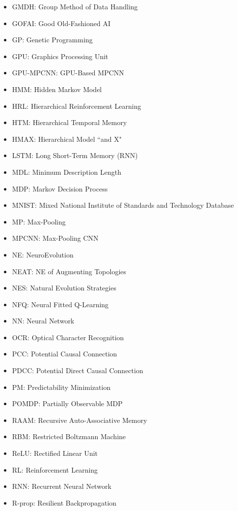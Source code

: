 \documentclass[letterpaper]{article}
\begin{document}
\begin{CJK*}{UTF8}{gbsn}
\begin{multicols}{2}
\begin{itemize}[leftmargin=0cm,itemindent=0cm,labelwidth=\itemindent,labelsep=0cm,align=left,noitemsep,nolistsep]
\item[] GMDH: Group Method of Data Handling  
\item[] GOFAI: Good Old-Fashioned AI  
\item[] GP: Genetic Programming 
\item[] GPU: Graphics Processing Unit 
\item[] GPU-MPCNN: GPU-Based MPCNN  
\item[] HMM: Hidden Markov Model 
\item[] HRL: Hierarchical Reinforcement Learning 
\item[] HTM:  Hierarchical Temporal Memory 
\item[] HMAX:  Hierarchical Model ``and X"
\item[] LSTM: Long Short-Term Memory (RNN) 
\item[] MDL: Minimum Description Length 
\item[] MDP:  Markov Decision Process 
\item[] MNIST: Mixed National Institute of Standards and Technology Database 
\item[] MP: Max-Pooling 
\item[] MPCNN: Max-Pooling CNN
\item[] NE: NeuroEvolution 
\item[] NEAT: NE of Augmenting Topologies 
\item[] NES: Natural Evolution Strategies 
\item[] NFQ: Neural Fitted Q-Learning 
\item[] NN: Neural Network 
\item[] OCR: Optical Character Recognition
\item[] PCC: Potential Causal Connection 
\item[] PDCC: Potential Direct Causal Connection 
\item[] PM: Predictability Minimization 
\item[] POMDP:  Partially Observable MDP 
\item[] RAAM: Recursive Auto-Associative Memory  
\item[] RBM: Restricted Boltzmann Machine 
\item[] ReLU: Rectified Linear Unit
\item[] RL: Reinforcement Learning 
\item[] RNN: Recurrent Neural Network 
\item[] R-prop: Resilient Backpropagation 

\end{itemize}
\end{multicols}
\end{CJK*}
\end{document}

